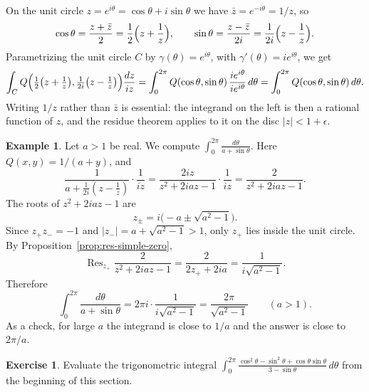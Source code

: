\documentclass[11pt]{article}
\theoremstyle{plain}
\theoremstyle{definition}
\newtheorem{example}[theorem]{Example}
\newtheorem{exercise}[theorem]{Exercise}
\theoremstyle{boldremark}
\theoremstyle{remark}
\numberwithin{equation}{section}
\newenvironment{lecturefigure}
 {\par\addvspace{0.25em}\begingroup\setlength{\parskip}{0pt}\centering}
 {\par\endgroup\addvspace{0.25em}}
\begin{document}
On the unit circle $z=e^{i\theta}=\cos\theta+i\sin\theta$ we have
$\bar z=e^{-i\theta}=1/z$, so
\[
 \cos\theta=\frac{z+\bar z}{2}=\frac12\Bigl(z+\frac1z\Bigr),\qquad
 \sin\theta=\frac{z-\bar z}{2i}=\frac{1}{2i}\Bigl(z-\frac1z\Bigr).
\]
Parametrizing the unit circle $C$ by $\gamma(\theta)=e^{i\theta}$, with
$\gamma'(\theta)=ie^{i\theta}$, we get
\[
 \int_C Q\Bigl(\tfrac12\bigl(z+\tfrac1z\bigr),\tfrac1{2i}\bigl(z-\tfrac1z\bigr)\Bigr)
 \frac{dz}{iz}
 =\int_0^{2\pi}Q(\cos\theta,\sin\theta)\,\frac{ie^{i\theta}}{ie^{i\theta}}\,d\theta
 =\int_0^{2\pi}Q(\cos\theta,\sin\theta)\,d\theta.
\]
Writing $1/z$ rather than $\bar z$ is essential: the integrand on the left
is then a rational function of $z$, and the residue theorem applies to it
on the disc $|z|<1+\epsilon$.

\begin{example}
Let $a>1$ be real. We compute $\displaystyle\int_0^{2\pi}\frac{d\theta}{a+\sin\theta}$.
Here $Q(x,y)=1/(a+y)$, and
\[
 \frac{1}{a+\frac{1}{2i}(z-\frac1z)}\cdot\frac{1}{iz}
 =\frac{2iz}{z^2+2iaz-1}\cdot\frac{1}{iz}
 =\frac{2}{z^2+2iaz-1}.
\]
The roots of $z^2+2iaz-1$ are
\[
 z_\pm=i\bigl(-a\pm\sqrt{a^2-1}\bigr).
\]
Since $z_+z_-=-1$ and $|z_-|=a+\sqrt{a^2-1}>1$, only $z_+$ lies inside the
unit circle. By Proposition~\ref{prop:res-simple-zero},
\[
 \operatorname{Res}_{z_+}\frac{2}{z^2+2iaz-1}=\frac{2}{2z_++2ia}
 =\frac{1}{i\sqrt{a^2-1}}.
\]
Therefore
\[
 \boxed{\int_0^{2\pi}\frac{d\theta}{a+\sin\theta}
 =2\pi i\cdot\frac{1}{i\sqrt{a^2-1}}=\frac{2\pi}{\sqrt{a^2-1}}\qquad(a>1).}
\]
As a check, for large $a$ the integrand is close to $1/a$ and the answer
is close to $2\pi/a$.
\end{example}

\begin{lecturefigure}
\end{lecturefigure}

\begin{exercise}
Evaluate the trigonometric integral
$\displaystyle\int_0^{2\pi}\frac{\cos^2\theta-\sin^2\theta+\cos\theta\sin\theta}{3-\sin\theta}\,d\theta$
from the beginning of this section.
\end{exercise}
\endgroup
\end{document}
